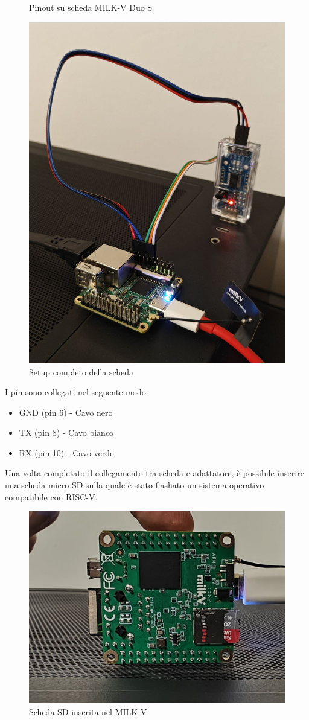 \begin{figure}[!htb]
  \caption{Pinout su scheda MILK-V Duo S}\label{fig:awesome_image2}
\endminipage\hfill
{}%
  \includegraphics[width=\linewidth]{images/duo_uart.jpg}
  \caption{Setup completo della scheda}\label{fig:awesome_image3}
\endminipage
\end{figure}
\vspace{1cm}
\FloatBarrier
I pin sono collegati nel seguente modo
\begin{itemize}
    \item GND (pin 6) - Cavo nero
    \item TX (pin 8) - Cavo bianco
    \item RX (pin 10) - Cavo verde
\end{itemize}
Una volta completato il collegamento tra scheda e adattatore, è possibile inserire una scheda micro-SD sulla quale è stato flashato un sistema operativo compatibile con RISC-V.
\vspace{1cm}
\FloatBarrier
\begin{figure}[!htbp]
    \centering
    \includegraphics[width=0.3\linewidth]{images/duo_bottom.jpg}
    \caption{Scheda SD inserita nel MILK-V}
\end{figure}
